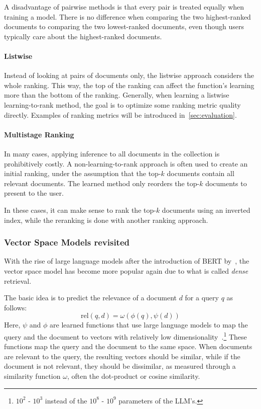 A disadvantage of pairwise methods is that every pair is treated equally when training a model. There is no difference when comparing the two highest-ranked documents to comparing the two lowest-ranked documents, even though users typically care about the highest-ranked documents. 

\paragraph{Listwise} Instead of looking at pairs of documents only, the listwise approach considers the whole ranking. This way, the top of the ranking can affect the function's learning more than the bottom of the ranking.
Generally, when learning a listwise learning-to-rank method, the goal is to optimize some ranking metric quality directly. Examples of ranking metrics will be introduced in~\cref{sec:evaluation}.

\paragraph{Multistage Ranking}
\label{sec:multistage}
In many cases, applying inference to all documents in the collection is prohibitively costly. A non-learning-to-rank approach is often used to create an initial ranking, under the assumption that the top-$k$ documents contain all relevant documents. The learned method only reorders the top-$k$ documents to present to the user. 

In these cases, it can make sense to rank the top-$k$ documents using an inverted index, while the reranking is done with another ranking approach.

\subsubsection{Vector Space Models revisited}
With the rise of large language models after the introduction of BERT by~\cite{BERT}, the vector space model has become more popular again due to what is called \emph{dense} retrieval.  

The basic idea is to predict the relevance of a document $d$ for a query $q$ as follows:
\begin{equation}
	\text{rel}(q, d) = \omega\left(\phi\left(q\right),
	\psi\left(d\right)\right)
\end{equation}
Here, $\psi$ and $\phi$ are learned functions that use large language models to map the query and the document to vectors with relatively low dimensionality~\citep{seperation-logical-physical}.\footnote{$10^2$ - $10^3$ instead of the $10^8$ - $10^9$ parameters of the LLM's.} These functions map the query and the document to the same space. When documents are relevant to the query, the resulting vectors should be similar, while if the document is not relevant, they should be dissimilar, as measured through a similarity function $\omega$, often the dot-product or cosine similarity.


